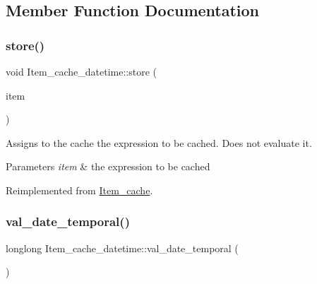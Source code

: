 \subsection{Member Function Documentation}
\mbox{\label{classItem__cache__datetime_a75bbda93393db797f710521aabd9200c}} 
\subsubsection{\texorpdfstring{store()}{store()}}
{\footnotesize\ttfamily void Item\+\_\+cache\+\_\+datetime\+::store (\begin{DoxyParamCaption}\item[{\mbox{\hyperlink{classItem}{Item}} $\ast$}]{item }\end{DoxyParamCaption})\hspace{0.3cm}{\ttfamily [virtual]}}

Assigns to the cache the expression to be cached. Does not evaluate it. 
\begin{DoxyParams}{Parameters}
{\em item} & the expression to be cached \\
\hline
\end{DoxyParams}


Reimplemented from \mbox{\hyperlink{classItem__cache_a89d0134e0a71238cb6fa7a32a23f88e7}{Item\+\_\+cache}}.

\mbox{\label{classItem__cache__datetime_ab2431102a1d70199b6d9438c12ac3b24}} 
\subsubsection{\texorpdfstring{val\+\_\+date\+\_\+temporal()}{val\_date\_temporal()}}
{\footnotesize\ttfamily longlong Item\+\_\+cache\+\_\+datetime\+::val\+\_\+date\+\_\+temporal (\begin{DoxyParamCaption}{ }\end{DoxyParamCaption})\hspace{0.3cm}{\ttfamily [virtual]}}

